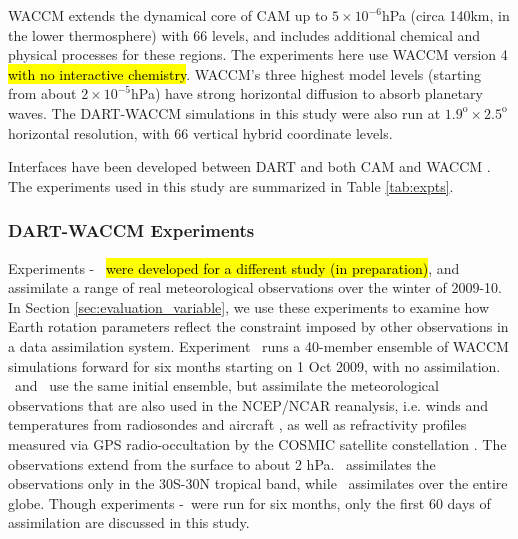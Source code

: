 
WACCM \citep{Marsh2013} extends the dynamical core of CAM up to $5 \times 10^{-6}$hPa (circa 140km, in the lower thermosphere) with 66 levels, and includes additional chemical and physical processes for these regions. 
The experiments here use WACCM version 4 \hl{with no interactive chemistry}.
WACCM's three highest model levels (starting from about $2 \times 10^{-5}$hPa) have strong horizontal diffusion to absorb planetary waves. 
The DART-WACCM simulations in this study were also run at $1.9^{\text{o}} \times 2.5^{\text{o}}$ horizontal resolution, with 66 vertical hybrid coordinate levels. 

Interfaces have been developed between DART and both CAM \citep{Raeder2012} and WACCM \citep{Pedatella2013}.
The experiments used in this study are summarized in Table \ref{tab:expts}.

\subsubsection{DART-WACCM Experiments}
Experiments \WACCMNODA-\WACCMGLOBAL~ \hl{were developed for a different study (in preparation)}, and assimilate a range of real meteorological observations over the winter of 2009-10. 
In Section \ref{sec:evaluation_variable}, we use these experiments  
to examine how Earth rotation parameters reflect the constraint imposed by other observations in a data assimilation system.  
Experiment \WACCMNODA~runs a 40-member ensemble of WACCM simulations forward for six months starting on 1 Oct 2009, with no assimilation. 
\WACCMTROPICS~and \WACCMGLOBAL~use the same initial ensemble, but assimilate the meteorological observations that are also used in the NCEP/NCAR reanalysis, i.e. winds and temperatures from radiosondes and aircraft \citep{Saha2010}, as well as refractivity profiles measured via GPS radio-occultation by the COSMIC satellite constellation \citep{Anthes2008}.
The observations extend from the surface to about 2 hPa. 
\WACCMTROPICS~assimilates the observations only in the 30S-30N tropical band, while \WACCMGLOBAL~assimilates over the entire globe.
Though experiments \WACCMNODA-\WACCMGLOBAL~were run for six months, only the first 60 days of assimilation are discussed in this study.  

